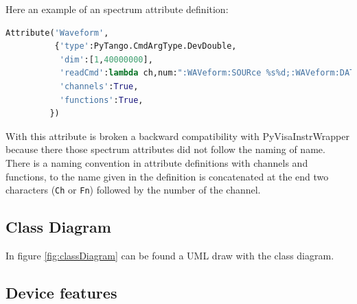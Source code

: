 \documentclass[a4paper,10pt]{article}
\begin{document}
Here an example of an spectrum attribute definition:

\begin{lstlisting}[language=python,basicstyle=\footnotesize]
Attribute('Waveform',
          {'type':PyTango.CmdArgType.DevDouble,
           'dim':[1,40000000],
           'readCmd':lambda ch,num:":WAVeform:SOURce %s%d;:WAVeform:DATA?"%(ch,num),
           'channels':True,
           'functions':True,
         })
\end{lstlisting}

With this attribute is broken a backward compatibility with PyVisaInstrWrapper because there those spectrum attributes did not follow the naming of name. There is a naming convention in attribute definitions with channels and functions, to the name given in the definition is concatenated at the end two characters ({\tt Ch} or {\tt Fn}) followed by the number of the channel.

\subsection{Class Diagram}

In figure \ref{fig:classDiagram} can be found a UML draw with the class diagram.

\begin{figure}[h!]
\end{figure}

\subsection{Device features}
\end{document}

